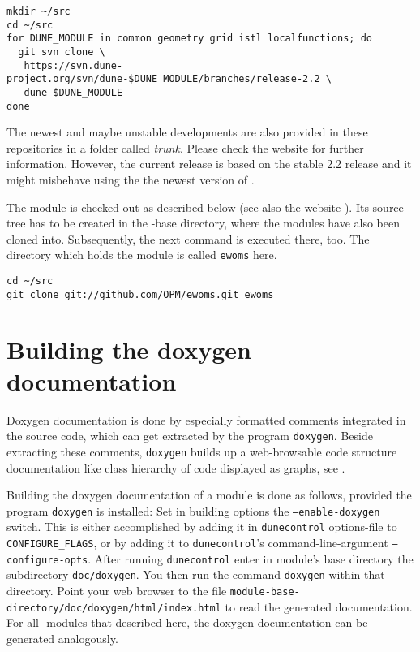 \begin{lstlisting}[style=Bash]
mkdir ~/src
cd ~/src
for DUNE_MODULE in common geometry grid istl localfunctions; do
  git svn clone \
   https://svn.dune-project.org/svn/dune-$DUNE_MODULE/branches/release-2.2 \
   dune-$DUNE_MODULE
done
\end{lstlisting}

The newest and maybe unstable developments are also provided in these
repositories in a folder called \emph{trunk}. Please check the \Dune
website \cite{DUNE-DOWNLOAD-SVN} for further information. However, the
current \eWoms release is based on the stable 2.2 \Dune release and it
might misbehave using the the newest version of \Dune.

The \eWoms module is checked out as described below (see also the
\eWoms website \cite{EWOMS-HP}).  Its source tree has to be created in
the \Dune-base directory, where the \Dune modules have also been
cloned into. Subsequently, the next command is executed there,
too. The directory which holds the \eWoms module is called
\texttt{ewoms} here.

\begin{lstlisting}[style=Bash]
cd ~/src
git clone git://github.com/OPM/ewoms.git ewoms
\end{lstlisting}

\section{Building the doxygen documentation}
\label{sec:build-doxy-doc}

Doxygen documentation is done by especially formatted comments
integrated in the source code, which can get extracted by the program
\texttt{doxygen}. Beside extracting these comments, \texttt{doxygen}
builds up a web-browsable code structure documentation like class
hierarchy of code displayed as graphs, see \cite{DOXYGEN-HP}.

Building the doxygen documentation of a module is done as follows,
provided the program \texttt{doxygen} is installed: Set in building
options the \texttt{--enable-doxygen} switch.  This is either
accomplished by adding it in \texttt{dunecontrol} options-file to
\texttt{CONFIGURE\_FLAGS}, or by adding it to \texttt{dunecontrol}'s
command-line-argument \texttt{--configure-opts}.  After running
\texttt{dunecontrol} enter in module's base directory the subdirectory
\texttt{doc/doxygen}.  You then run the command \texttt{doxygen}
within that directory. Point your web browser to the file
\texttt{module-base-directory/doc/doxygen/html/index.html} to read the
generated documentation.  For all \Dune-modules that described here,
the doxygen documentation can be generated analogously.

